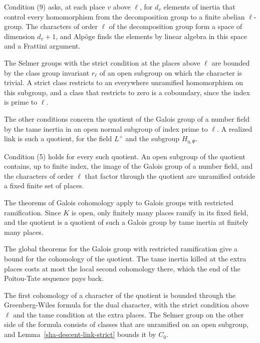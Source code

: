 Condition (9) asks, at each place $v$ above $\ell$, for $d_v$ elements of inertia that control every homomorphism from the decomposition group to a finite abelian $\ell$-group. The characters of order $\ell$ of the decomposition group form a space of dimension $d_v+1$, and Alpöge finds the elements by linear algebra in this space and a Frattini argument.

The Selmer groups with the strict condition at the places above $\ell$ are bounded by the class group invariant $r_\ell$ of an open subgroup on which the character is trivial. A strict class restricts to an everywhere unramified homomorphism on this subgroup, and a class that restricts to zero is a coboundary, since the index is prime to $\ell$.

The other conditions concern the quotient of the Galois group of a number field by the tame inertia in an open normal subgroup of index prime to $\ell$. A realized link is such a quotient, for the field $L^+$ and the subgroup $H_{\eta,\Psi}$.

Condition (5) holds for every such quotient. An open subgroup of the quotient contains, up to finite index, the image of the Galois group of a number field, and the characters of order $\ell$ that factor through the quotient are unramified outside a fixed finite set of places.

The theorems of Galois cohomology apply to Galois groups with restricted ramification. Since $K$ is open, only finitely many places ramify in its fixed field, and the quotient is a quotient of such a Galois group by tame inertia at finitely many places.

The global theorems for the Galois group with restricted ramification give a bound for the cohomology of the quotient. The tame inertia killed at the extra places costs at most the local second cohomology there, which the end of the Poitou-Tate sequence pays back.

The first cohomology of a character of the quotient is bounded through the Greenberg-Wiles formula for the dual character, with the strict condition above $\ell$ and the tame condition at the extra places. The Selmer group on the other side of the formula consists of classes that are unramified on an open subgroup, and Lemma~\ref{sha-descent-link-strict} bounds it by $C_0$.

